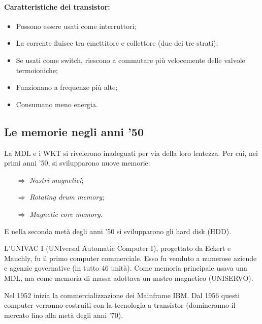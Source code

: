 \paragraph{Caratteristiche dei transistor:}

\begin{itemize}
    \item Possono essere usati come interruttori;
    \item La corrente fluisce tra emettitore e collettore (due dei tre strati);
    \item Se usati come switch, riescono a commutare più velocemente delle valvole termoioniche;
    \item Funzionano a frequenze più alte;
    \item Consumano meno energia.
\end{itemize}
 

\subsection{Le memorie negli anni '50}

La MDL e i WKT si rivelerono inadeguati per via della loro lentezza. Per cui, nei primi
anni '50, si svilupparono nuove memorie:

\begin{itemize}
    \item [$\Rightarrow$] \textit{Nastri magnetici};
    \item [$\Rightarrow$] \textit{Rotating drum memory};
    \item [$\Rightarrow$] \textit{Magnetic core memory}.
\end{itemize}

E nella seconda metà degli anni '50 si svilupparono gli hard disk (HDD).


L'UNIVAC I (UNIversal Automatic Computer I), progettato da Eckert e Mauchly, fu il primo computer
commerciale. Esso fu venduto a numerose aziende e agenzie governative (in tutto 46 unità). Come
memoria principale usava una MDL, ma come memoria di massa adottava un nastro magnetico
(UNISERVO).

Nel 1952 inizia la commercializzazione dei Mainframe IBM. Dal 1956 questi computer
verranno costruiti con la tecnologia a transistor (domineranno il mercato fino alla metà degli
anni '70).

